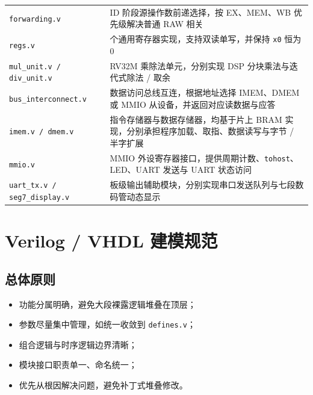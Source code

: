 ﻿\documentclass[12pt,a4paper]{ctexart}
\begin{document}
\begin{longtable}{>{\raggedright\arraybackslash}p{}>{\raggedright\arraybackslash}p{}}
    \texttt{forwarding.v} & ID 阶段源操作数前递选择，按 EX、MEM、WB 优先级解决普通 RAW 相关 \\
    \texttt{regs.v} & 32 个通用寄存器实现，支持双读单写，并保持 \texttt{x0} 恒为 0 \\
    \texttt{mul\_unit.v / div\_unit.v} & RV32M 乘除法单元，分别实现 DSP 分块乘法与迭代式除法 / 取余 \\
    \texttt{bus\_interconnect.v} & 数据访问总线互连，根据地址选择 IMEM、DMEM 或 MMIO 从设备，并返回对应读数据与应答 \\
    \texttt{imem.v / dmem.v} & 指令存储器与数据存储器，均基于片上 BRAM 实现，分别承担程序加载、取指、数据读写与字节 / 半字扩展 \\
    \texttt{mmio.v} & MMIO 外设寄存器接口，提供周期计数、\texttt{tohost}、LED、UART 发送与 UART 状态访问 \\
    \texttt{uart\_tx.v / seg7\_display.v} & 板级输出辅助模块，分别实现串口发送队列与七段数码管动态显示 \\
    \bottomrule
\end{longtable}

\section{Verilog / VHDL 建模规范}

\subsection{总体原则}
\begin{itemize}
    \item 功能分属明确，避免大段裸露逻辑堆叠在顶层；
    \item 参数尽量集中管理，如统一收敛到 \texttt{defines.v}；
    \item 组合逻辑与时序逻辑边界清晰；
    \item 模块接口职责单一、命名统一；
    \item 优先从根因解决问题，避免补丁式堆叠修改。
\end{itemize}
\end{document}
